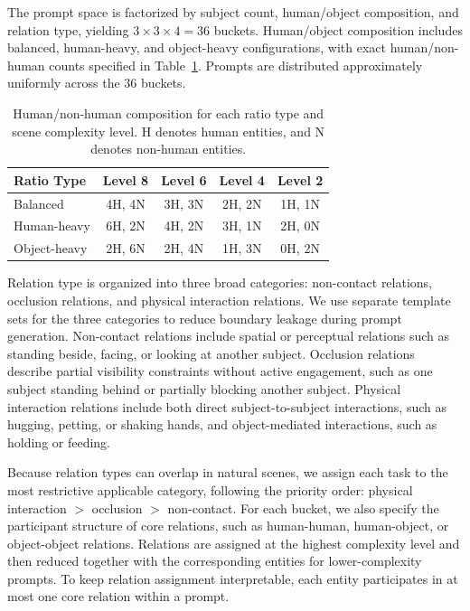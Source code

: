 The prompt space is factorized by subject count, human/object composition, and relation type, yielding $3 \times 3 \times 4 = 36$ buckets. Human/object composition includes balanced, human-heavy, and object-heavy configurations, with exact human/non-human counts specified in Table~\ref{tab:entity_ratio_levels}. Prompts are distributed approximately uniformly across the 36 buckets.

\begin{table}[t]
\centering
\small
\begin{tabular}{lcccc}
\toprule
\textbf{Ratio Type} & \textbf{Level 8} & \textbf{Level 6} & \textbf{Level 4} & \textbf{Level 2} \\
\midrule
Balanced
& 4H, 4N
& 3H, 3N
& 2H, 2N
& 1H, 1N \\

Human-heavy
& 6H, 2N
& 4H, 2N
& 3H, 1N
& 2H, 0N \\

Object-heavy
& 2H, 6N
& 2H, 4N
& 1H, 3N
& 0H, 2N \\
\bottomrule
\end{tabular}
\caption{Human/non-human composition for each ratio type and scene complexity level. H denotes human entities, and N denotes non-human entities.}
\label{tab:entity_ratio_levels}
\end{table}

Relation type is organized into three broad categories: non-contact relations, occlusion relations, and physical interaction relations. We use separate template sets for the three categories to reduce boundary leakage during prompt generation. Non-contact relations include spatial or perceptual relations such as standing beside, facing, or looking at another subject. Occlusion relations describe partial visibility constraints without active engagement, such as one subject standing behind or partially blocking another subject. Physical interaction relations include both direct subject-to-subject interactions, such as hugging, petting, or shaking hands, and object-mediated interactions, such as holding or feeding.

Because relation types can overlap in natural scenes, we assign each task to the most restrictive applicable category, following the priority order: physical interaction $>$ occlusion $>$ non-contact. For each bucket, we also specify the participant structure of core relations, such as human-human, human-object, or object-object relations. Relations are assigned at the highest complexity level and then reduced together with the corresponding entities for lower-complexity prompts. To keep relation assignment interpretable, each entity participates in at most one core relation within a prompt.

